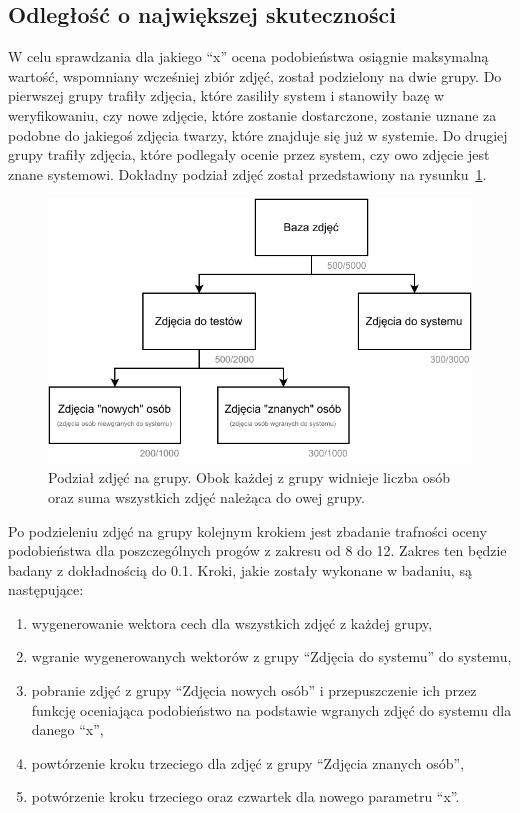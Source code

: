 \subsection{Odległość o największej skuteczności}

W celu sprawdzania dla jakiego ``x'' ocena podobieństwa osiągnie maksymalną wartość,
wspomniany wcześniej zbiór zdjęć, został podzielony na dwie grupy.
Do pierwszej grupy trafiły zdjęcia, które zasiliły system i stanowiły bazę
w weryfikowaniu, czy nowe zdjęcie, które zostanie dostarczone,
zostanie uznane za podobne do jakiegoś zdjęcia twarzy, które znajduje się już w systemie.
Do drugiej grupy trafiły zdjęcia, które podlegały ocenie przez system, czy owo zdjęcie jest znane systemowi.
Dokładny podział zdjęć został przedstawiony na rysunku~\ref{fig:podzial_zdjec}.

\begin{figure}[H]
    \centering
    \includegraphics[width=1\textwidth]{images/podzial_zdjec}
    \caption{
        Podział zdjęć na grupy. Obok każdej z grupy widnieje liczba osób oraz suma
        wszystkich zdjęć należąca do owej grupy.
    }
    \customsource
    \label{fig:podzial_zdjec}
\end{figure}

Po podzieleniu zdjęć na grupy kolejnym krokiem jest zbadanie trafności oceny podobieństwa dla poszczególnych
progów z zakresu od \num{8} do \num{12}.
Zakres ten będzie badany z dokładnością do \num{0.1}.
Kroki, jakie zostały wykonane w badaniu, są następujące:

\begin{enumerate}
    \item wygenerowanie wektora cech dla wszystkich zdjęć z każdej grupy,
    \item wgranie wygenerowanych wektorów z grupy ``Zdjęcia do systemu'' do systemu,
    \item pobranie zdjęć z grupy ``Zdjęcia nowych osób'' i przepuszczenie ich przez
    funkcję oceniająca podobieństwo na podstawie wgranych zdjęć do systemu dla danego ``x'',
    \item powtórzenie kroku trzeciego dla zdjęć z grupy ``Zdjęcia znanych osób'',
    \item potwórzenie kroku trzeciego oraz czwartek dla nowego parametru ``x''.
\end{enumerate}

